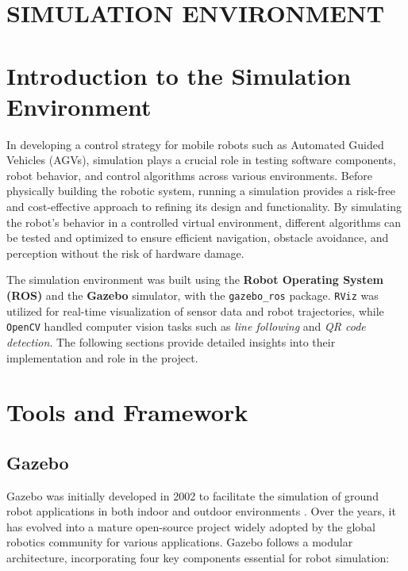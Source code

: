\documentclass[../../main]{subfiles}
\begin{document}
\section{SIMULATION ENVIRONMENT}
\lstset{language=XML}
\section{Introduction to the Simulation Environment}
In developing a control strategy for mobile robots such as Automated Guided Vehicles (AGVs),
simulation plays a crucial role in testing software components, robot behavior, and control algorithms across various environments. 
Before physically building the robotic system, running a simulation provides a risk-free and cost-effective approach to refining 
its design and functionality. By simulating the robot's behavior in a controlled virtual environment, different algorithms can 
be tested and optimized to ensure efficient navigation, obstacle avoidance, and perception without the risk of hardware damage. 

The simulation environment was built using the \textbf{Robot Operating System (ROS)} 
and the \textbf{Gazebo} simulator, with the \texttt{gazebo\_ros} 
package. \texttt{RViz} was utilized for real-time visualization of sensor data and robot trajectories, 
while \texttt{OpenCV} handled computer vision tasks such as \textit{line following} and \textit{QR code detection}. The following sections provide 
detailed insights into their implementation and role in the project.\\
\newpage
\section{Tools and Framework}
\subsection{Gazebo}

Gazebo was initially developed in 2002 to facilitate the simulation of ground robot applications in both indoor and outdoor environments \cite{koenig2004design}. 
Over the years, it has evolved into a mature open-source project widely adopted by the global robotics community for various applications. 
Gazebo follows a modular architecture, incorporating four key components essential for robot simulation:
\end{document}
